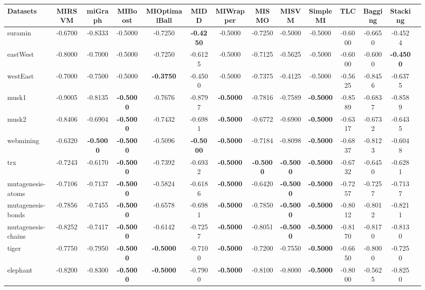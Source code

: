 \begin{threeparttable}
\begin{tabular}{lccccccccccccc}
\toprule
Datasets &MIRSVM &miGraph &MIBoost &MIOptimalBall &MIDD &MIWrapper &MISMO &MISVM &SimpleMI &TLC &Bagging &Stacking \\
\midrule
suramin &-0.6700 &-0.8333 &-0.5000 &-0.7250 &\textbf{-0.4250} &-0.5000 &-0.7250 &-0.5000 &-0.5000 &-0.6000 &-0.6650 &-0.4524 &  \\
eastWest &-0.8000 &-0.7000 &-0.5000 &-0.7250 &-0.6125 &-0.5000 &-0.7125 &-0.5625 &-0.5000 &-0.6000 &-0.6000 &\textbf{-0.4500} &  \\
westEast &-0.7000 &-0.7500 &-0.5000 &\textbf{-0.3750} &-0.4500 &-0.5000 &-0.7375 &-0.4125 &-0.5000 &-0.5625 &-0.8456 &-0.6375 &  \\
musk1 &-0.9005 &-0.8135 &\textbf{-0.5000} &-0.7676 &-0.8797 &\textbf{-0.5000} &-0.7816 &-0.7589 &\textbf{-0.5000} &-0.8589 &-0.6837 &-0.8589 &  \\
musk2 &-0.8406 &-0.6904 &\textbf{-0.5000} &-0.7432 &-0.6981 &\textbf{-0.5000} &-0.6772 &-0.6900 &\textbf{-0.5000} &-0.6317 &-0.6732 &-0.6435 &  \\
webmining &-0.6320 &\textbf{-0.5000} &\textbf{-0.5000} &-0.5096 &\textbf{-0.5000} &\textbf{-0.5000} &-0.7184 &-0.8098 &\textbf{-0.5000} &-0.6837 &-0.8123 &-0.6048 &  \\
trx &-0.7243 &-0.6170 &\textbf{-0.5000} &-0.7392 &-0.6932 &\textbf{-0.5000} &\textbf{-0.5000} &\textbf{-0.5000} &\textbf{-0.5000} &-0.6732 &-0.6450 &-0.6281 &  \\
mutagenesis-atoms &-0.7106 &-0.7137 &\textbf{-0.5000} &-0.5824 &-0.6186 &\textbf{-0.5000} &-0.6420 &\textbf{-0.5000} &\textbf{-0.5000} &-0.7257 &-0.7257 &-0.7137 &  \\
mutagenesis-bonds &-0.7856 &-0.7455 &\textbf{-0.5000} &-0.6578 &-0.6981 &\textbf{-0.5000} &-0.7850 &\textbf{-0.5000} &\textbf{-0.5000} &-0.8012 &-0.8012 &-0.8211 &  \\
mutagenesis-chains &-0.8252 &-0.7417 &\textbf{-0.5000} &-0.6142 &-0.7257 &\textbf{-0.5000} &-0.8051 &\textbf{-0.5000} &\textbf{-0.5000} &-0.8170 &-0.8170 &-0.8130 &  \\
tiger &-0.7750 &-0.7950 &\textbf{-0.5000} &\textbf{-0.5000} &-0.7100 &\textbf{-0.5000} &-0.7200 &-0.7550 &\textbf{-0.5000} &-0.6650 &-0.8000 &-0.7250 &  \\
elephant &-0.8200 &-0.8300 &\textbf{-0.5000} &\textbf{-0.5000} &-0.7900 &\textbf{-0.5000} &-0.8100 &-0.8000 &\textbf{-0.5000} &-0.8000 &-0.5625 &-0.8250 &  \\

\end{tabular}
\end{threeparttable}

